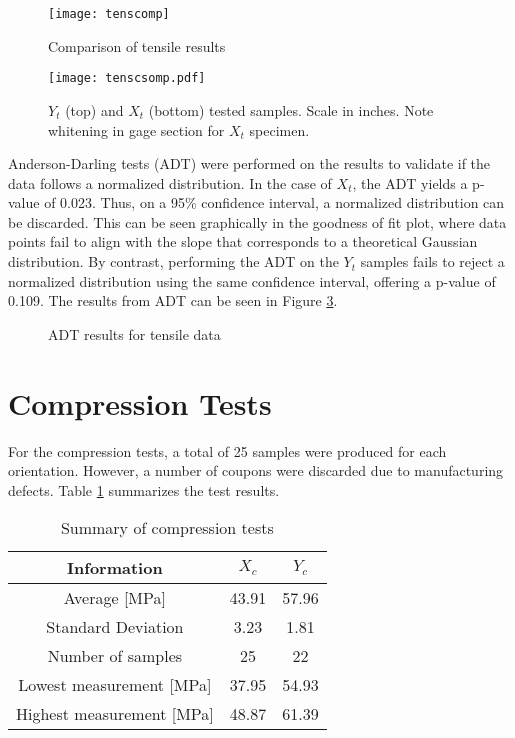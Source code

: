 \documentclass[main.tex]{subfiles}
\begin{document}
\begin{figure}[h]
	\center
	\texttt{[image: tenscomp]}
	\caption{Comparison of tensile results} \label{fig:tensComp}
\end{figure}

\begin{figure}[!htbp]
	\center
	\texttt{[image: tenscsomp.pdf]}
	\captionsetup{justification=centering} %
	\caption[$X_t$ and $Y_t$ tested samples]{$Y_t$ (top) and $X_t$ (bottom) tested samples. Scale in inches. Note whitening in gage section for $X_t$ specimen.} \label{fig:tensSComp}
\end{figure}

Anderson-Darling tests (ADT) were performed on the results to validate if the data follows a normalized distribution. In the case of $X_t$, the ADT yields a p-value of 0.023. Thus, on a 95\% confidence interval, a normalized distribution can be discarded. This can be seen graphically in the goodness of fit plot, where data points fail to align with the slope that corresponds to a theoretical Gaussian distribution. By contrast, performing the ADT on the $Y_t$ samples fails to reject a normalized distribution using the same confidence interval, offering a p-value of 0.109. %
The results from ADT can be seen in Figure \ref{fig:adttens}.

\begin{figure}[!htbp]
	\center
	\hfill
	\caption{ADT results for tensile data} \label{fig:adttens}
\end{figure}

\pagebreak
      
\section{Compression Tests} \label{sec:compr}
For the compression tests, a total of 25 samples were produced for each orientation. However, a number of coupons were discarded due to manufacturing defects. Table \ref{tab:comprtab} summarizes the test results.  

\begin{table} [h]
	\centering
	\caption{Summary of compression tests}%
	\begin{tabular}{ c| c c } 
		\toprule
		\textbf{Information} & $X_c$ & $Y_c$\\
		\midrule
		Average [MPa] &43.91  & 57.96\\
		Standard Deviation &3.23  & 1.81\\
		Number of samples &25  & 22\\
		Lowest measurement [MPa] &37.95 &54.93 \\
		Highest measurement [MPa] &48.87 &61.39 \\
		\bottomrule
	\end{tabular}
\label{tab:comprtab}
\end{table}
\end{document}
